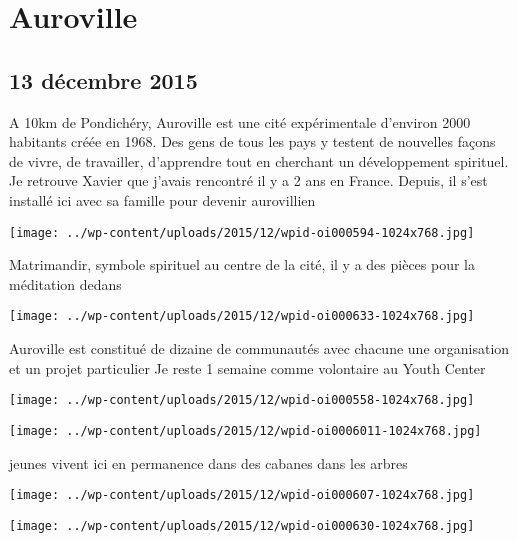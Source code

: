 \chapter{Auroville}
\section*{13 décembre 2015}
A 10km de Pondichéry, Auroville est une cité expérimentale d'environ 2000 habitants créée en 1968. Des gens de tous les pays y testent de nouvelles façons de vivre, de travailler, d'apprendre tout en cherchant un développement spirituel. \newline
 Je retrouve Xavier que j'avais rencontré il y a 2 ans en France. Depuis, il s'est installé ici avec sa famille pour devenir aurovillien \newline
 \newline
\centerline{\texttt{[image: ../wp-content/uploads/2015/12/wpid-oi000594-1024x768.jpg]} } 
 \newline
 Matrimandir, symbole spirituel au centre de la cité, il y a des pièces pour la méditation dedans \newline
 \newline
\centerline{\texttt{[image: ../wp-content/uploads/2015/12/wpid-oi000633-1024x768.jpg]} } 
 \newline
 Auroville est constitué de dizaine de communautés avec chacune une organisation et un projet particulier \newline
 Je reste 1 semaine comme volontaire au Youth Center \newline
 \newline
\centerline{\texttt{[image: ../wp-content/uploads/2015/12/wpid-oi000558-1024x768.jpg]} } 
 \newline
 \newline
\centerline{\texttt{[image: ../wp-content/uploads/2015/12/wpid-oi0006011-1024x768.jpg]} } 
  jeunes vivent ici en permanence dans des cabanes dans les arbres \newline
 \newline
\centerline{\texttt{[image: ../wp-content/uploads/2015/12/wpid-oi000607-1024x768.jpg]} } 
 \newline
 \newline
\centerline{\texttt{[image: ../wp-content/uploads/2015/12/wpid-oi000630-1024x768.jpg]} } 
 \newline
 \newline
